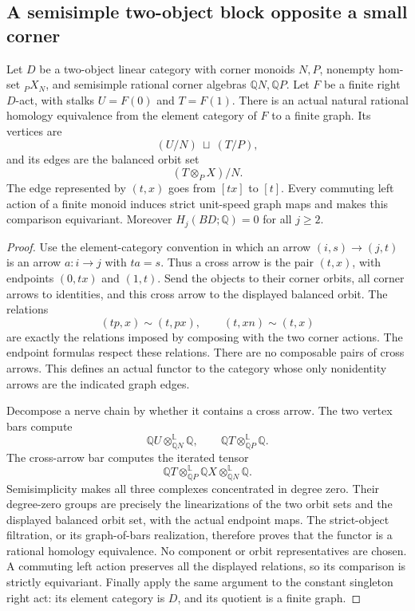 \subsection{A semisimple two-object block opposite a small corner}

\begin{lemma}
\label{C:semisimple-pair-element-graph}
Let $D$ be a two-object linear category with corner monoids
$N,P$, nonempty hom-set ${}_PX_N$, and semisimple rational
corner algebras $\mathbb QN,\mathbb QP$. Let $F$ be a finite
right $D$-act, with stalks $U=F(0)$ and $T=F(1)$.
There is an actual natural rational homology equivalence from
the element category of $F$ to a finite graph. Its vertices are
\[
 (U/N)\ \sqcup\ (T/P),
\]
and its edges are the balanced orbit set
\[
 (T\otimes_P X)/N.
\]
The edge represented by $(t,x)$ goes from $[tx]$ to $[t]$.
Every commuting left action of a finite monoid induces strict
unit-speed graph maps and makes this comparison equivariant.
Moreover $H_j(BD;\mathbb Q)=0$ for all $j\geq2$.
\end{lemma}
\begin{proof}
Use the element-category convention in which an arrow
$(i,s)\to(j,t)$ is an arrow $a:i\to j$ with $ta=s$.
Thus a cross arrow is the pair $(t,x)$, with endpoints
$(0,tx)$ and $(1,t)$. Send the objects to their corner
orbits, all corner arrows to identities, and this cross
arrow to the displayed balanced orbit. The relations
\[
 (tp,x)\sim(t,px),\qquad (t,xn)\sim(t,x)
\]
are exactly the relations imposed by composing with the two
corner actions. The endpoint formulas respect these relations.
There are no composable pairs of cross arrows. This defines an
actual functor to the category whose only nonidentity arrows
are the indicated graph edges.

Decompose a nerve chain by whether it contains a cross arrow.
The two vertex bars compute
\[
 \mathbb QU\otimes^{\mathbb L}_{\mathbb QN}\mathbb Q,
 \qquad
 \mathbb QT\otimes^{\mathbb L}_{\mathbb QP}\mathbb Q.
\]
The cross-arrow bar computes the iterated tensor
\[
 \mathbb QT\otimes^{\mathbb L}_{\mathbb QP}
 \mathbb QX\otimes^{\mathbb L}_{\mathbb QN}\mathbb Q.
\]
Semisimplicity makes all three complexes concentrated in
degree zero. Their degree-zero groups are precisely the
linearizations of the two orbit sets and the displayed
balanced orbit set, with the actual endpoint maps. The
strict-object filtration, or its graph-of-bars realization,
therefore proves that the functor is a rational homology
equivalence. No component or orbit representatives are chosen.
A commuting left action preserves all the displayed relations,
so its comparison is strictly equivariant. Finally apply the
same argument to the constant singleton right act: its element
category is $D$, and its quotient is a finite graph.
\end{proof}

